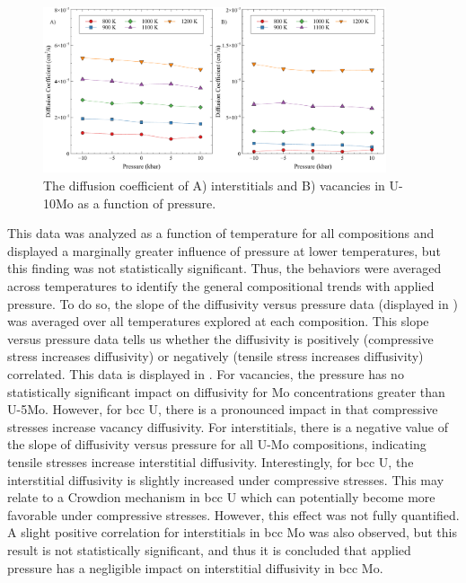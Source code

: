 \documentclass[review]{elsarticle}
\begin{document}
\begin{figure}[h!]
    \centering
    \includegraphics[width=0.9\textwidth]{int_vac_p.pdf}
    \caption{The diffusion coefficient of A) interstitials and B) vacancies in U-10Mo as a function of pressure.}
    \label{fig:int_vac_p}
\end{figure}

This data was analyzed as a function of temperature for all compositions and displayed a marginally greater influence of pressure at lower temperatures, but this finding was not statistically significant. Thus, the behaviors were averaged across temperatures to identify the general compositional trends with applied pressure. To do so, the slope of the diffusivity versus pressure data (displayed in ) was averaged over all temperatures explored at each composition. This slope versus pressure data tells us whether the diffusivity is positively (compressive stress increases diffusivity) or negatively (tensile stress increases diffusivity) correlated. This data is displayed in . For vacancies, the pressure has no statistically significant impact on diffusivity for Mo concentrations greater than U-5Mo. However, for bcc U, there is a pronounced impact in that compressive stresses increase vacancy diffusivity. For interstitials, there is a negative value of the slope of diffusivity versus pressure for all U-Mo compositions, indicating tensile stresses increase interstitial diffusivity. Interestingly, for bcc U, the interstitial diffusivity is slightly increased under compressive stresses. This may relate to a Crowdion mechanism \cite{crowdion} in bcc U which can potentially become more favorable under compressive stresses. However, this effect was not fully quantified. A slight positive correlation for interstitials in bcc Mo was also observed, but this result is not statistically significant, and thus it is concluded that applied pressure has a negligible impact on interstitial diffusivity in bcc Mo.
\end{document}
